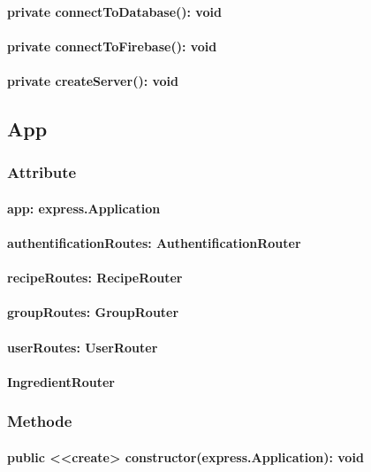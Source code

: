 \documentclass[parskip=full]{scrartcl}
\begin{document}
\paragraph{private connectToDatabase(): void}
\paragraph{private connectToFirebase(): void}
\paragraph{private createServer(): void}


\subsection{App}
\subsubsection*{Attribute}
\paragraph{app: express.Application}
\paragraph{authentificationRoutes: AuthentificationRouter}
\paragraph{recipeRoutes: RecipeRouter}
\paragraph{groupRoutes: GroupRouter}
\paragraph{userRoutes: UserRouter}
\paragraph{IngredientRouter}

\subsubsection*{Methode}
\paragraph{public <<create> constructor(express.Application): void}
\end{document}
